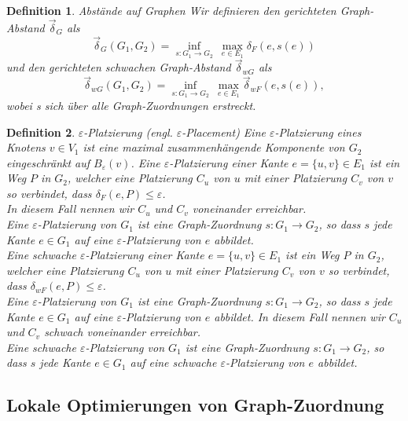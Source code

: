 \documentclass[a4paper, 12pt, twoside]{article}
\theoremstyle{Format1} %
\newtheorem{Def}{Definition}[section]       %
\begin{document}
\begin{Def}
	Abstände auf Graphen
	Wir definieren den \textit{gerichteten Graph-Abstand} $ \vec{\delta}_G $ als
	$$ \vec{\delta}_G(G_1,G_2) = \inf_{s: G_1 \to G_2} \: \max_{e \in E_1} \delta_F(e, s(e)) $$
	und den \textit{gerichteten schwachen Graph-Abstand} $ \vec{\delta}_{wG} $ als
	$$  \vec{\delta}_{wG}(G_1,G_2) = \inf_{s: G_1 \to G_2} \: \max_{e \in E_1} \vec{\delta}_{wF}(e, s(e)), $$
	wobei s sich über alle Graph-Zuordnungen erstreckt.
\end{Def}

\begin{Def}
	$\varepsilon$-Platzierung (engl. $\varepsilon$-Placement)
	Eine \textit{$\varepsilon$-Platzierung eines Knotens $v \in V_1$} ist eine maximal zusammenhängende Komponente von $G_2$ eingeschränkt auf $B_{\varepsilon}(v)$.
	Eine \textit{$\varepsilon$-Platzierung einer Kante $e = \{u,v\} \in E_1$} ist ein Weg $P$ in $G_2$, welcher eine Platzierung $C_u$ von $u$ mit einer Platzierung $C_v$ von $v$
	so verbindet, dass $\delta_F(e, P) \leq \varepsilon$.
	\\
	In diesem Fall nennen wir $C_u$ und $C_v$ \textit{voneinander erreichbar}.
	\\
	Eine \textit{$\varepsilon$-Platzierung von $G_1$} ist eine Graph-Zuordnung $s: G_1 \to G_2$, so dass $s$ jede Kante $e \in G_1$ auf eine $\varepsilon$-Platzierung von $e$ abbildet.
	\\
	Eine schwache $\varepsilon$-Platzierung einer Kante $e = \{u,v\} \in E_1$ ist ein Weg $P$ in $G_2$, welcher eine Platzierung $C_u$ von $u$ mit einer Platzierung $C_v$ von $v$
	so verbindet, dass $\delta_{wF}(e, P) \leq \varepsilon$.
	\\
	Eine \textit{$\varepsilon$-Platzierung von $G_1$} ist eine Graph-Zuordnung $s: G_1 \to G_2$, so dass $s$ jede Kante $e \in G_1$ auf eine $\varepsilon$-Platzierung von $e$ abbildet.
	In diesem Fall nennen wir $C_u$ und $C_v$ \textit{schwach voneinander erreichbar}.
	\\
	Eine schwache \textit{$\varepsilon$-Platzierung von $G_1$} ist eine Graph-Zuordnung $s: G_1 \to G_2$, so dass $s$ jede Kante $e \in G_1$ auf eine schwache $\varepsilon$-Platzierung von $e$ abbildet.
\end{Def}

\subsection{Lokale Optimierungen von Graph-Zuordnung}
\end{document}
